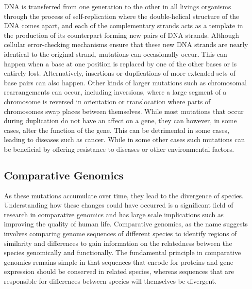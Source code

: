 DNA is transferred from one generation to the other in all livings organisms through the process of self-replication where the double-helical structure of the DNA comes apart, and each of the complementary strands acts as a template in the production of its counterpart forming new pairs of DNA strands\cite{pray2008semi}. Although cellular error-checking mechanisms ensure that these new DNA strands are nearly identical to the original strand, mutations can occasionally occur. This can happen when a base at one position is replaced by one of the other bases or is entirely lost. Alternatively, insertions or duplications of more extended sets of base pairs can also happen. Other kinds of larger mutations such as chromosomal rearrangements can occur, including inversions, where a large segment of a chromosome is reversed in orientation or translocation where parts of chromosomes swap places between themselves\cite{hartwell2008genetics}. While most mutations that occur during duplication do not have an affect on a gene, they can however, in some cases, alter the function of the gene. This can be detrimental in some cases, leading to diseases such as cancer. While in some other cases such mutations can be beneficial by offering resistance to diseases or other environmental factors. 

\subsection{Comparative Genomics}\label{comparegenomics}

As these mutations accumulate over time, they lead to the divergence of species. Understanding how these changes could have occurred is a significant field of research in comparative genomics and has large scale implications such as improving the quality of human life\cite{collins2003vision}. Comparative genomics, as the name suggests involves comparing genome sequences of different species to identify regions of similarity and differences to gain information on the relatedness between the species genomically and functionally. The fundamental principle in comparative genomics remains simple in that sequences that encode for proteins and gene expression should be conserved in related species, whereas sequences that are responsible for differences between species will themselves be divergent\cite{hardison2003comparative}.

